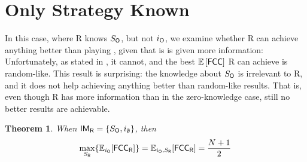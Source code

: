 \documentclass[letterpaper, 10 pt, conference]{ieeeconf}  %
\newtheorem{theorem}{Theorem}
\theoremstyle{definition}
\newcommand{\rob}{{{\sf R}}\xspace}
\newcommand{\opp}{{{\sf O}}\xspace}
\newcommand{\fcc}{{{\sf{FCC}}}\xspace}
\newcommand{\IM}{{{\sf{IM}}}\xspace}
\newcommand{\crs}{{{\sf{CRS}}}\xspace}
\begin{document}
\section{Only Strategy Known} 

In this case, where \rob knows $S_\opp$, but not $i_\opp$, we examine whether \rob can achieve anything better than playing \crs, given that is is given more information: Unfortunately, as stated in , it cannot, and the best $\mathbb{E}\left[\fcc\right]$ \rob can achieve is random-like.
This result is surprising: the knowledge about $S_\opp$ is irrelevant to \rob, and it does not help achieving anything better than random-like results. That is, even though \rob has more information than in the zero-knowledge case, still no better results are achievable.

\begin{theorem}\label{theorems: 2d max fcc unknown io}
When $\IM_\rob=\lbrace S_\opp , i_\emptyset \rbrace$, then 
\[\max_{S_\rob} \lbrace \mathbb{E}_{i_\opp}[\fcc_\rob]\rbrace=\mathbb{E}_{i_\opp,S_\rob}[\fcc_\rob]=\frac{N+1}{2}\]
\end{theorem}
\end{document}
